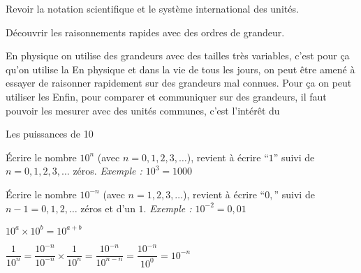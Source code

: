 \teteSndMeth
\vspace*{-30pt}

\begin{objectifs}
  \item Revoir la notation scientifique et le système international des unités.
  \item Découvrir les raisonnements rapides avec des ordres de grandeur.
\end{objectifs}

\begin{contexte}
  En physique on utilise des grandeurs avec des tailles très variables, c'est pour ça qu'on utilise la 
  En physique et dans la vie de tous les jours, on peut être amené à essayer de raisonner rapidement sur des grandeurs mal connues. Pour ça on peut utiliser les 
  Enfin, pour comparer et communiquer sur des grandeurs, il faut pouvoir les mesurer avec des unités communes, c'est l'intérêt du 
\end{contexte}


\vspace*{-12pt}

\begin{doc}{Les puissances de 10}
  \begin{importants}
  \begin{listePoints}
    \item Écrire le nombre $10^n$ (avec $n = 0, 1, 2, 3, \ldots$), revient à écrire ``$1$'' suivi de $n = 0, 1, 2, 3, \ldots$ zéros. \textit{Exemple : $10^3 = 1000$}
    \item Écrire le nombre $10^{-n}$ (avec $n = 1, 2, 3, \ldots$), revient à écrire ``$0,$'' suivi de $n - 1 = 0, 1, 2, \ldots$ zéros et d'un $1$. \textit{Exemple : $10^{-2} = 0,\!01$}
    \item $10^a \times 10^b = 10^{a + b}$
    \item $\dfrac{1}{10^n} 
    = \dfrac{10^{-n}}{10^{-n}} \times \dfrac{1}{10^n} 
    = \dfrac{10^{-n}}{10^{n - n}}
    = \dfrac{10^{-n}}{10^0}
    = 10^{-n}$
  \end{listePoints}
  \end{importants}
\end{doc}

